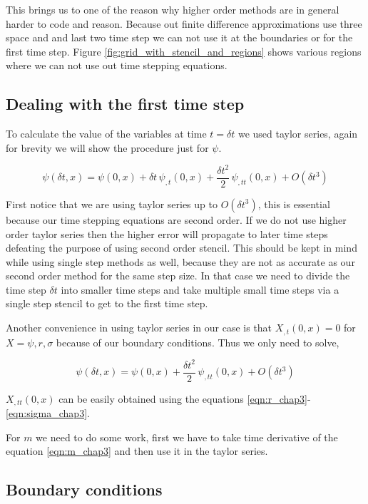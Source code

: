This brings us to one of the reason why higher order methods are in general harder to code and reason. Because out finite difference approximations use three space and and last two time step we can not use it at the boundaries or for the first time step. Figure \ref{fig:grid_with_stencil_and_regions} shows various regions where we can not use out time stepping equations.


\subsection{Dealing with the first time step}

To calculate the value of the variables at time $t = \delta t$ we used taylor series, again for brevity we will show the procedure just for $\psi$.

\begin{equation*}
    \psi(\delta t,x) = \psi(0,x) + \delta t\, \psi_{,t}(0,x) + \frac{\delta t^2}{2} \, \psi_{,tt}(0,x) + O(\delta t^3)
\end{equation*}


First notice that we are using taylor series up to $O(\delta t^3)$, this is essential because our time stepping equations are second order. If we do not use higher order taylor series then the higher error will propagate to later time steps defeating the purpose of using second order stencil. This should be kept in mind while using single step methods as well, because they are not as accurate as our second order method for the same step size. In that case we need to divide the time step $\delta t$ into smaller time steps and take multiple small time steps via a single step stencil to get to the first time step.


Another convenience in using taylor series in our case is that $X_{,t}(0,x) = 0$ for $X = \psi, r ,\sigma$ because of our boundary conditions. Thus we only need to solve,

\begin{equation*}
    \psi(\delta t,x) = \psi(0,x) + \frac{\delta t^2}{2} \, \psi_{,tt}(0,x) + O(\delta t^3)
\end{equation*}

$X_{,tt}(0,x)$ can be easily obtained using the equations \ref{eqn:r_chap3}-\ref{eqn:sigma_chap3}.


For $m$ we need to do some work, first we have to take time derivative of the equation \ref{eqn:m_chap3} and then use it in the taylor series.


\subsection{Boundary conditions}


